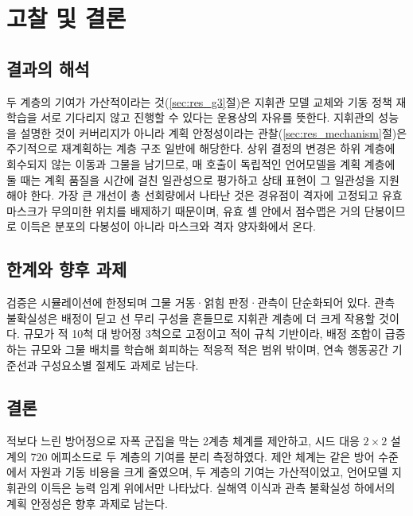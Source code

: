 \section{고찰 및 결론}
\label{sec:discussion}

\subsection{결과의 해석}

두 계층의 기여가 가산적이라는 것(\ref{sec:res_g3}절)은 지휘관 모델 교체와 기동 정책 재학습을
서로 기다리지 않고 진행할 수 있다는 운용상의 자유를 뜻한다. 지휘관의 성능을 설명한 것이
커버리지가 아니라 계획 안정성이라는 관찰(\ref{sec:res_mechanism}절)은 주기적으로 재계획하는 계층
구조 일반에 해당한다. 상위 결정의 변경은 하위 계층에 회수되지 않는 이동과 그물을 남기므로, 매
호출이 독립적인 언어모델을 계획 계층에 둘 때는 계획 품질을 시간에 걸친 일관성으로 평가하고 상태
표현이 그 일관성을 지원해야 한다. 가장 큰 개선이 총 선회량에서 나타난 것은 경유점이 격자에
고정되고 유효 마스크가 무의미한 위치를 배제하기 때문이며, 유효 셀 안에서 점수맵은 거의 단봉이므로
이득은 분포의 다봉성이 아니라 마스크와 격자 양자화에서 온다.

\subsection{한계와 향후 과제}
\label{sec:limitations}

검증은 시뮬레이션에 한정되며 그물 거동·얽힘 판정·관측이 단순화되어 있다. 관측 불확실성은 배정이
딛고 선 무리 구성을 흔들므로 지휘관 계층에 더 크게 작용할 것이다. 규모가 적 10척 대 방어정 3척으로
고정이고 적이 규칙 기반이라, 배정 조합이 급증하는 규모와 그물 배치를 학습해 회피하는 적응적
적은 범위 밖이며, 연속 행동공간 기준선과 구성요소별 절제도 과제로 남는다.

\subsection{결론}
\label{sec:conclusion}

적보다 느린 방어정으로 자폭 군집을 막는 2계층 체계를 제안하고, 시드 대응 $2\times2$ 설계의
720 에피소드로 두 계층의 기여를 분리 측정하였다. 제안 체계는 같은 방어 수준에서 자원과 기동
비용을 크게 줄였으며, 두 계층의 기여는 가산적이었고, 언어모델 지휘관의 이득은 능력 임계 위에서만
나타났다. 실해역 이식과 관측 불확실성 하에서의 계획 안정성은 향후 과제로 남는다.
